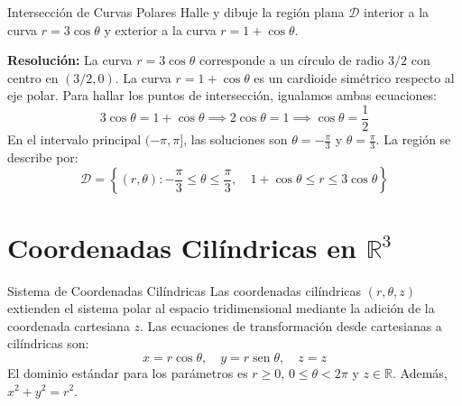 \documentclass[11pt,a4paper]{article}
\begin{document}
\begin{ejemplobox}{Intersección de Curvas Polares}
Halle y dibuje la región plana $\mathcal{D}$ interior a la curva $r = 3 \cos \theta$ y exterior a la curva $r = 1 + \cos \theta$.

\textbf{Resolución:}
La curva $r = 3 \cos \theta$ corresponde a un círculo de radio $3/2$ con centro en $(3/2, 0)$. La curva $r = 1 + \cos \theta$ es un cardioide simétrico respecto al eje polar.
Para hallar los puntos de intersección, igualamos ambas ecuaciones:
\[ 3 \cos \theta = 1 + \cos \theta \implies 2 \cos \theta = 1 \implies \cos \theta = \frac{1}{2} \]
En el intervalo principal $(-\pi, \pi]$, las soluciones son $\theta = -\frac{\pi}{3}$ y $\theta = \frac{\pi}{3}$.
La región se describe por:
\[ \mathcal{D} = \left\{ (r, \theta) : -\frac{\pi}{3} \leq \theta \leq \frac{\pi}{3}, \quad 1 + \cos \theta \leq r \leq 3 \cos \theta \right\} \]
\begin{center}
\end{center}
\end{ejemplobox}

\section{Coordenadas Cilíndricas en $\mathbb{R}^3$}

\begin{definicionbox}{Sistema de Coordenadas Cilíndricas}
Las coordenadas cilíndricas $(r, \theta, z)$ extienden el sistema polar al espacio tridimensional mediante la adición de la coordenada cartesiana $z$. Las ecuaciones de transformación desde cartesianas a cilíndricas son:
\[ x = r \cos \theta, \quad y = r \operatorname{sen} \theta, \quad z = z \]
El dominio estándar para los parámetros es $r \geq 0$, $0 \leq \theta < 2\pi$ y $z \in \mathbb{R}$.
Además, $x^2 + y^2 = r^2$.
\end{definicionbox}
\end{document}
